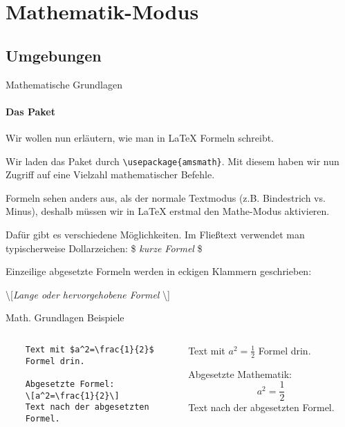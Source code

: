 \section{Mathematik-Modus}
\subsection{Umgebungen}
\begin{frame}[fragile]{Mathematische Grundlagen}
\framesubtitle{Das Paket }
Wir wollen nun erläutern, wie man in \LaTeX{} Formeln schreibt.

\medskip\pause
Wir laden das Paket  durch \verb+\usepackage{amsmath}+. Mit diesem haben wir nun Zugriff auf eine Vielzahl mathematischer Befehle.

\medskip\pause
Formeln sehen anders aus, als der normale Textmodus (z.B. Bindestrich vs. Minus), deshalb müssen wir in \LaTeX{} erstmal den Mathe-Modus aktivieren.

\medskip\pause
Dafür gibt es verschiedene Möglichkeiten. Im Fließtext verwendet man typischerweise Dollarzeichen: \$ \emph{kurze Formel} \$

Einzeilige abgesetzte Formeln werden in eckigen Klammern geschrieben: 
\begin{center}
\textbackslash[\emph{Lange oder hervorgehobene Formel} \textbackslash]
\end{center}
\end{frame}

\begin{frame}[fragile]{Math. Grundlagen Beispiele}
\begin{columns}
\begin{column}{.48\textwidth}\footnotesize
\begin{codeblock}
\begin{verbatim}
	Text mit $a^2=\frac{1}{2}$
	Formel drin.

	Abgesetzte Formel:
	\[a^2=\frac{1}{2}\]
	Text nach der abgesetzten
	Formel.
\end{verbatim}
\end{codeblock}
\end{column}
%
\begin{column}{.45\textwidth}	\pause	
	Text mit $a^2=\frac{1}{2}$ Formel drin.
    
    \pause
	Abgesetzte Mathematik:
	\[a^2=\frac{1}{2}\]
	Text nach der abgesetzten Formel.
\end{column}
\end{columns}
\end{frame}





